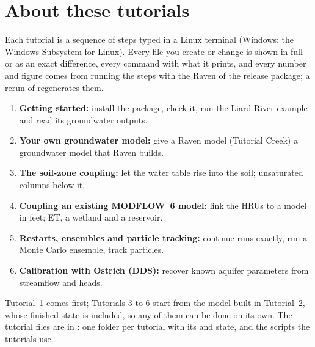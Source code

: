\chapter*{About these tutorials}
Each tutorial is a sequence of steps typed in a Linux terminal (Windows: the Windows Subsystem for Linux). Every file you
create or change is shown in full or as an exact difference, every command with what it prints, and every number and
figure comes from running the steps with the Raven of the release package; a rerun of 
regenerates them.
\begin{enumerate}
\item \textbf{Getting started:} install the package, check it, run the Liard River example and read its groundwater outputs.
\item \textbf{Your own groundwater model:} give a Raven model (Tutorial Creek) a groundwater model that Raven builds.
\item \textbf{The soil-zone coupling:} let the water table rise into the soil; unsaturated columns below it.
\item \textbf{Coupling an existing MODFLOW~6 model:} link the HRUs to a model in feet; ET, a wetland and a reservoir.
\item \textbf{Restarts, ensembles and particle tracking:} continue runs exactly, run a Monte Carlo ensemble, track particles.
\item \textbf{Calibration with Ostrich (DDS):} recover known aquifer parameters from streamflow and heads.
\end{enumerate}
Tutorial~1 comes first; Tutorials 3 to 6 start from the model built in Tutorial~2, whose finished state is included, so
any of them can be done on its own. The tutorial files are in : one folder per
tutorial with its  and  state, and the scripts the tutorials use.
\cleardoublepage
{}
